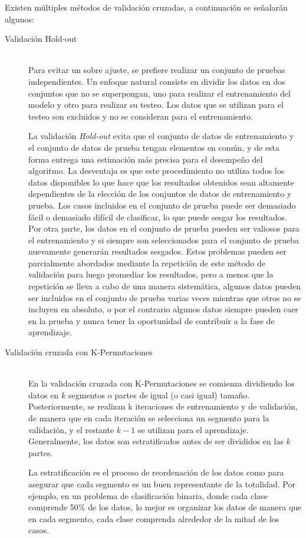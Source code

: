 Existen múltiples métodos de validación cruzadas, a continuación se señalarán algunos:
    \begin{description}
      \item[Validación Hold-out] \hfill \\
      Para evitar un sobre ajuste, se prefiere realizar un conjunto de pruebas independientes. Un enfoque natural consiste en dividir los datos en dos conjuntos que no se superpongan, uno para realizar el entrenamiento del modelo y otro para realizar su testeo. Los datos que se utilizan para el testeo son excluidos y no se consideran para el entrenamiento. 
      
      La validación \textit{Hold-out} evita que el conjunto de datos de entrenamiento y el conjunto de datos de prueba tengan elementos en común, y de esta forma entrega una estimación más precisa para el desempeño del algoritmo. La desventaja es que este procedimiento no utiliza todos los datos disponibles lo que hace que los resultados obtenidos sean altamente dependientes de la elección de los conjuntos de datos de entrenamiento y prueba. Los casos incluidos en el conjunto de prueba puede ser demasiado fácil o demasiado difícil de clasificar, lo que puede sesgar los resultados. Por otra parte, los datos en el conjunto de prueba pueden ser valiosos para el entrenamiento y si siempre son seleccionados para el conjunto de prueba nuevamente generarán resultados sesgados. Estos problemas pueden ser parcialmente abordados mediante la repetición de este método de validación para luego promediar los resultados, pero a menos que la repetición se lleva a cabo de una manera sistemática, algunos datos pueden ser incluidos en el conjunto de prueba varias veces mientras que otros no se incluyen en absoluto, o por el contrario algunos datos siempre pueden caer en la prueba y nunca tener la oportunidad de contribuir a la fase de aprendizaje. 
      \item[Validación cruzada con K-Permutaciones] \hfill \\
      En la validación cruzada con K-Permutaciones se comienza dividiendo los datos en $k$ segmentos o partes de igual (o casi igual) tamaño. Posteriormente, se realizan k iteraciones de entrenamiento y de validación, de manera que en cada iteración se selecciona un segmento para la validación, y el restante $k-1$ se utilizan para el aprendizaje. Generalmente, los datos son estratificados antes de ser divididos en las $k$ partes.
      
      La estratificación es el proceso de reordenación de los datos como para asegurar que cada segmento es un buen representante de la totalidad. Por ejemplo, en un problema de clasificación binaria, donde cada clase comprende 50\% de los datos, lo mejor es organizar los datos de manera que en cada segmento, cada clase comprenda alrededor de la mitad de los casos.
     

\end{description}
